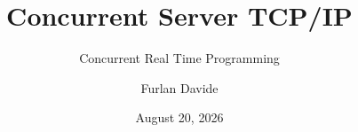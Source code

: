 \documentclass{beamer}
\title{Concurrent Server TCP/IP}
\subtitle{Concurrent Real Time Programming}
\author[Furlan Davide]{Furlan Davide}
\date{August 20, 2026}
\begin{document}
\frame{\titlepage}


    
\end{document}
